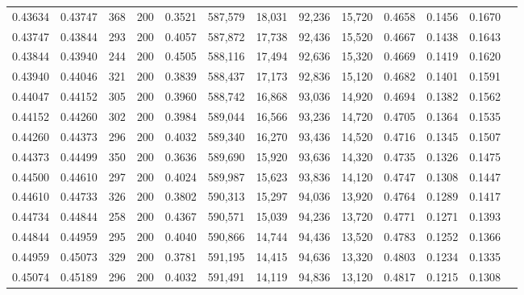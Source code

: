 \begin{tabular}{rrrrrrrrrrrrr}
0.43634 & 0.43747 &   368 & 200 &                                     0.3521 & 587,579 &  18,031 &  92,236 &  15,720 & 0.4658 & 0.1456 & 0.1670 \\
0.43747 & 0.43844 &   293 & 200 &                                     0.4057 & 587,872 &  17,738 &  92,436 &  15,520 & 0.4667 & 0.1438 & 0.1643 \\
0.43844 & 0.43940 &   244 & 200 &                                     0.4505 & 588,116 &  17,494 &  92,636 &  15,320 & 0.4669 & 0.1419 & 0.1620 \\
0.43940 & 0.44046 &   321 & 200 &                                     0.3839 & 588,437 &  17,173 &  92,836 &  15,120 & 0.4682 & 0.1401 & 0.1591 \\
0.44047 & 0.44152 &   305 & 200 &                                     0.3960 & 588,742 &  16,868 &  93,036 &  14,920 & 0.4694 & 0.1382 & 0.1562 \\
0.44152 & 0.44260 &   302 & 200 &                                     0.3984 & 589,044 &  16,566 &  93,236 &  14,720 & 0.4705 & 0.1364 & 0.1535 \\
0.44260 & 0.44373 &   296 & 200 &                                     0.4032 & 589,340 &  16,270 &  93,436 &  14,520 & 0.4716 & 0.1345 & 0.1507 \\
0.44373 & 0.44499 &   350 & 200 &                                     0.3636 & 589,690 &  15,920 &  93,636 &  14,320 & 0.4735 & 0.1326 & 0.1475 \\
0.44500 & 0.44610 &   297 & 200 &                                     0.4024 & 589,987 &  15,623 &  93,836 &  14,120 & 0.4747 & 0.1308 & 0.1447 \\
0.44610 & 0.44733 &   326 & 200 &                                     0.3802 & 590,313 &  15,297 &  94,036 &  13,920 & 0.4764 & 0.1289 & 0.1417 \\
0.44734 & 0.44844 &   258 & 200 &                                     0.4367 & 590,571 &  15,039 &  94,236 &  13,720 & 0.4771 & 0.1271 & 0.1393 \\
0.44844 & 0.44959 &   295 & 200 &                                     0.4040 & 590,866 &  14,744 &  94,436 &  13,520 & 0.4783 & 0.1252 & 0.1366 \\
0.44959 & 0.45073 &   329 & 200 &                                     0.3781 & 591,195 &  14,415 &  94,636 &  13,320 & 0.4803 & 0.1234 & 0.1335 \\
0.45074 & 0.45189 &   296 & 200 &                                     0.4032 & 591,491 &  14,119 &  94,836 &  13,120 & 0.4817 & 0.1215 & 0.1308 \\

\end{tabular}
